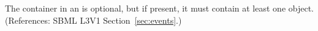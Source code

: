The \ListOfEventAssignments container in an \Event is optional, but
if present, it must contain at least one \EventAssignment object.
(References: SBML L3V1 Section~\ref{sec:events}.)
